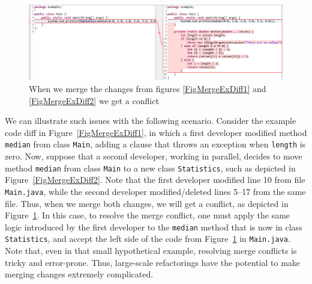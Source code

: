\begin{figure}[htbp]
\centering
\includegraphics[width=\linewidth]{img/merge-ex-conflict.png}
\caption{When we merge the changes from figures \ref{FigMergeExDiff1} and \ref{FigMergeExDiff2} we get a conflict}
\label{FigMergeExConflict}
\end{figure}

We can illustrate such issues with the following scenario. Consider the example code diff in Figure~\ref{FigMergeExDiff1}, in which a first developer modified method \texttt{median} from class \texttt{Main}, adding a clause that throws an exception when \texttt{length} is zero. Now, suppose that a second developer, working in parallel, decides to move method \texttt{median} from class \texttt{Main} to a new class \texttt{Statistics}, such as depicted in Figure~\ref{FigMergeExDiff2}.
Note that the first developer modified line 10 from file \texttt{Main.java}, while the second developer modified/deleted lines 5--17 from the same file.
Thus, when we merge both changes, we will get a conflict, as depicted in Figure~\ref{FigMergeExConflict}.
In this case, to resolve the merge conflict, one must apply the same logic introduced by the first developer to the \texttt{median} method that is now in class \texttt{Statistics}, and accept the left side of the code from Figure~\ref{FigMergeExConflict} in \texttt{Main.java}.
Note that, even in that small hypothetical example, resolving merge conflicts is tricky and error-prone.
Thus, large-scale refactorings have the potential to make merging changes extremely complicated.

